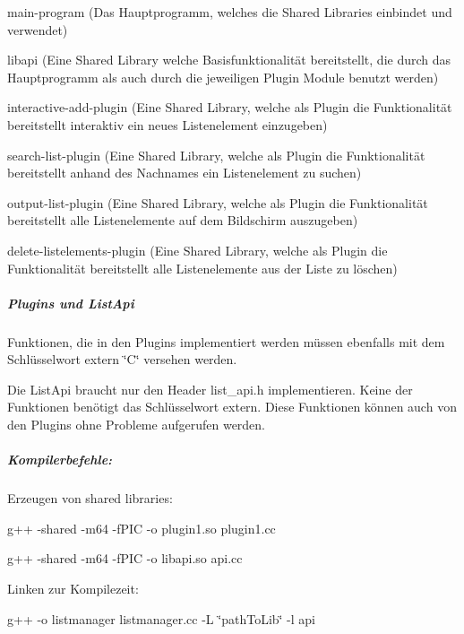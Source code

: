 \begin{DoxyItemize}
\item main-\/program (Das Hauptprogramm, welches die Shared Libraries einbindet und verwendet)
\item libapi (Eine Shared Library welche Basisfunktionalität bereitstellt, die durch das Hauptprogramm als auch durch die jeweiligen Plugin Module benutzt werden)
\item interactive-\/add-\/plugin (Eine Shared Library, welche als Plugin die Funktionalität bereitstellt interaktiv ein neues Listenelement einzugeben)
\item search-\/list-\/plugin (Eine Shared Library, welche als Plugin die Funktionalität bereitstellt anhand des Nachnames ein Listenelement zu suchen)
\item output-\/list-\/plugin (Eine Shared Library, welche als Plugin die Funktionalität bereitstellt alle Listenelemente auf dem Bildschirm auszugeben)
\item delete-\/listelements-\/plugin (Eine Shared Library, welche als Plugin die Funktionalität bereitstellt alle Listenelemente aus der Liste zu löschen)
\end{DoxyItemize}

\subparagraph*{Plugins und List\-Api}


\begin{DoxyItemize}
\item Funktionen, die in den Plugins implementiert werden müssen ebenfalls mit dem Schlüsselwort extern \char`\"{}\-C\char`\"{} versehen werden.
\item Die List\-Api braucht nur den Header list\-\_\-api.\-h implementieren. Keine der Funktionen benötigt das Schlüsselwort extern. Diese Funktionen können auch von den Plugins ohne Probleme aufgerufen werden.
\end{DoxyItemize}

\subparagraph*{Kompilerbefehle\-:}

Erzeugen von shared libraries\-:
\begin{DoxyItemize}
\item g++ -\/shared -\/m64 -\/f\-P\-I\-C -\/o plugin1.\-so plugin1.\-cc
\item g++ -\/shared -\/m64 -\/f\-P\-I\-C -\/o libapi.\-so api.\-cc
\end{DoxyItemize}

Linken zur Kompilezeit\-:
\begin{DoxyItemize}
\item g++ -\/o listmanager listmanager.\-cc -\/\-L \char`\"{}path\-To\-Lib\char`\"{} -\/l api
\end{DoxyItemize}

